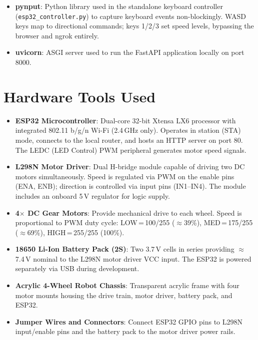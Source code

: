 \documentclass[12pt]{report}
\begin{document}
\begin{itemize}
    \item \textbf{pynput}: Python library used in the standalone keyboard
          controller (\texttt{esp32\_controller.py}) to capture keyboard events
          non-blockingly. WASD keys map to directional commands; keys 1/2/3 set
          speed levels, bypassing the browser and ngrok entirely.

    \item \textbf{uvicorn}: ASGI server used to run the FastAPI application
          locally on port 8000.
\end{itemize}

\section{Hardware Tools Used}

\begin{itemize}
    \item \textbf{ESP32 Microcontroller}: Dual-core 32-bit Xtensa LX6 processor
          with integrated 802.11 b/g/n Wi-Fi (2.4\,GHz only). Operates in
          station (STA) mode, connects to the local router, and hosts an HTTP
          server on port 80. The LEDC (LED Control) PWM peripheral generates
          motor speed signals.

    \item \textbf{L298N Motor Driver}: Dual H-bridge module capable of driving two
          DC motors simultaneously. Speed is regulated via PWM on the enable pins
          (ENA, ENB); direction is controlled via input pins (IN1--IN4). The
          module includes an onboard 5\,V regulator for logic supply.

    \item \textbf{4$\times$ DC Gear Motors}: Provide mechanical drive to each
          wheel. Speed is proportional to PWM duty cycle: LOW\,=\,100/255
          ($\approx$39\%), MED\,=\,175/255 ($\approx$69\%), HIGH\,=\,255/255
          (100\%).

    \item \textbf{18650 Li-Ion Battery Pack (2S)}: Two 3.7\,V cells in series
          providing $\approx$7.4\,V nominal to the L298N motor driver VCC input.
          The ESP32 is powered separately via USB during development.

    \item \textbf{Acrylic 4-Wheel Robot Chassis}: Transparent acrylic frame with
          four motor mounts housing the drive train, motor driver, battery pack,
          and ESP32.

    \item \textbf{Jumper Wires and Connectors}: Connect ESP32 GPIO pins to L298N
          input/enable pins and the battery pack to the motor driver power rails.
\end{itemize}
\end{document}
